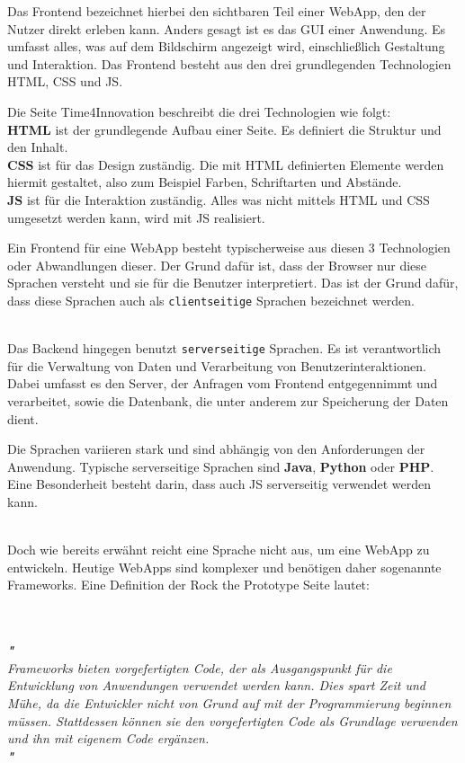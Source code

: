 \documentclass[biblatex]{lni}
\begin{document}
Das Frontend bezeichnet hierbei den sichtbaren Teil einer \ac{WebApp}, den der Nutzer direkt erleben kann. \cite{CMSRev}
Anders gesagt ist es das \ac{GUI} einer Anwendung.
Es umfasst alles, was auf dem Bildschirm angezeigt wird, einschließlich Gestaltung und Interaktion.
Das Frontend besteht aus den drei grundlegenden Technologien \ac{HTML}, \ac{CSS} und \ac{JS}.

Die Seite Time4Innovation \cite{T4I} beschreibt die drei Technologien wie folgt: \\
\textbf{\ac{HTML}} ist der grundlegende Aufbau einer Seite.
Es definiert die Struktur und den Inhalt. \\
\textbf{\ac{CSS}} ist für das Design zuständig.
Die mit \ac{HTML} definierten Elemente werden hiermit gestaltet, also zum Beispiel Farben, Schriftarten und Abstände. \\
\textbf{\ac{JS}} ist für die Interaktion zuständig.
Alles was nicht mittels \ac{HTML} und \ac{CSS} umgesetzt werden kann, wird mit \ac{JS} realisiert.

Ein Frontend für eine \ac{WebApp} besteht typischerweise aus diesen 3 Technologien oder Abwandlungen dieser. \cite{CoU}
Der Grund dafür ist, dass der Browser nur diese Sprachen versteht und sie für die Benutzer interpretiert.
Das ist der Grund dafür, dass diese Sprachen auch als \texttt{clientseitige} Sprachen bezeichnet werden.

\\

Das Backend hingegen benutzt \texttt{serverseitige} Sprachen. \cite{CMSRev}
Es ist verantwortlich für die Verwaltung von Daten und Verarbeitung von Benutzerinteraktionen.
Dabei umfasst es den Server, der Anfragen vom Frontend entgegennimmt und verarbeitet,
sowie die Datenbank, die unter anderem zur Speicherung der Daten dient.

Die Sprachen variieren stark und sind abhängig von den Anforderungen der Anwendung.
Typische serverseitige Sprachen sind \textbf{Java}, \textbf{Python} oder \textbf{PHP}.
Eine Besonderheit besteht darin, dass auch \ac{JS} serverseitig verwendet werden kann.

\\

Doch wie bereits erwähnt reicht eine Sprache nicht aus, um eine \ac{WebApp} zu entwickeln.
Heutige \ac{WebApp}s sind komplexer und benötigen daher sogenannte Frameworks.
Eine Definition der Rock the Prototype Seite lautet: \\
\begin{minipage}{\textwidth}
  \textit{
    \\
    \\
    \textbf{"} \\
    Frameworks bieten vorgefertigten Code,
    der als Ausgangspunkt für die Entwicklung von Anwendungen verwendet werden kann. Dies spart Zeit und Mühe,
    da die Entwickler nicht von Grund auf mit der Programmierung beginnen müssen.
    Stattdessen können sie den vorgefertigten Code als Grundlage verwenden und ihn mit eigenem Code ergänzen.
    \\
    \textbf{"} \\
    \Cite{RtP}
    \\
  }
\end{minipage}
\end{document}
